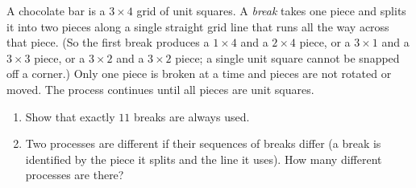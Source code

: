 A chocolate bar is a $3\times4$ grid of unit squares. A \emph{break} takes one piece and splits it into two pieces along a single straight grid line that runs all the way across that piece. (So the first break produces a $1\times4$ and a $2\times4$ piece, or a $3\times1$ and a $3\times3$ piece, or a $3\times2$ and a $3\times2$ piece; a single unit square cannot be snapped off a corner.) Only one piece is broken at a time and pieces are not rotated or moved. The process continues until all pieces are unit squares.
\begin{enumerate}
\item[(a)] Show that exactly $11$ breaks are always used.
\item[(b)] Two processes are different if their sequences of breaks differ (a break is identified by the piece it splits and the line it uses). How many different processes are there?
\end{enumerate}
